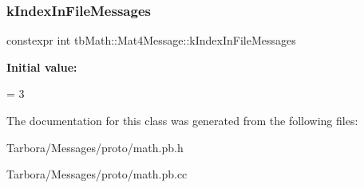\subsubsection{\texorpdfstring{k\+Index\+In\+File\+Messages}{kIndexInFileMessages}}
{\footnotesize\ttfamily constexpr int tb\+Math\+::\+Mat4\+Message\+::k\+Index\+In\+File\+Messages\hspace{0.3cm}{\ttfamily [static]}}

{\bfseries Initial value\+:}
\begin{DoxyCode}
=
    3
\end{DoxyCode}


The documentation for this class was generated from the following files\+:\begin{DoxyCompactItemize}
\item 
Tarbora/\+Messages/proto/math.\+pb.\+h\item 
Tarbora/\+Messages/proto/math.\+pb.\+cc\end{DoxyCompactItemize}
